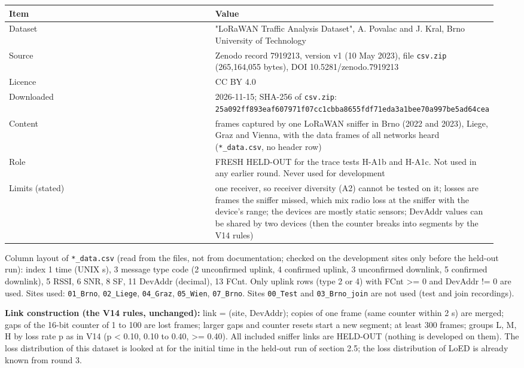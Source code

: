 {\scriptsize\raggedright
\begin{longtable}{p{0.475\linewidth}p{0.475\linewidth}}
\toprule
Item & Value \\
\midrule
\endhead
Dataset & "LoRaWAN Traffic Analysis Dataset", A. Povalac and J. Kral, Brno University of Technology \\
Source & Zenodo record 7919213, version v1 (10 May 2023), file \texttt{csv.zip} (265,164,055 bytes), DOI 10.5281/zenodo.7919213 \\
Licence & CC BY 4.0 \\
Downloaded & 2026-11-15; SHA-256 of \texttt{csv.zip}: \texttt{25a092ff893eaf607971f07cc1cbba8655fdf71eda3a1bee70a997be5ad64cea} \\
Content & frames captured by one LoRaWAN sniffer in Brno (2022 and 2023), Liege, Graz and Vienna, with the data frames of all networks heard (\texttt{*\_data.csv}, no header row) \\
Role & FRESH HELD-OUT for the trace tests H-A1b and H-A1c. Not used in any earlier round. Never used for development \\
Limits (stated) & one receiver, so receiver diversity (A2) cannot be tested on it; losses are frames the sniffer missed, which mix radio loss at the sniffer with the device's range; the devices are mostly static sensors; DevAddr values can be shared by two devices (then the counter breaks into segments by the V14 rules) \\
\bottomrule
\end{longtable}}

Column layout of \texttt{*\_data.csv} (read from the files, not from documentation; checked on the development sites only before the held-out run): index 1 time (UNIX s), 3 message type code (2 unconfirmed uplink, 4 confirmed uplink, 3 unconfirmed downlink, 5 confirmed downlink), 5 RSSI, 6 SNR, 8 SF, 11 DevAddr (decimal), 13 FCnt. Only uplink rows (type 2 or 4) with FCnt >= 0 and DevAddr != 0 are used. Sites used: \texttt{01\_Brno}, \texttt{02\_Liege}, \texttt{04\_Graz}, \texttt{05\_Wien}, \texttt{07\_Brno}. Sites \texttt{00\_Test} and \texttt{03\_Brno\_join} are not used (test and join recordings).

\textbf{Link construction (the V14 rules, unchanged):} link = (site, DevAddr); copies of one frame (same counter within 2 s) are merged; gaps of the 16-bit counter of 1 to 100 are lost frames; larger gaps and counter resets start a new segment; at least 300 frames; groups L, M, H by loss rate p as in V14 (p < 0.10, 0.10 to 0.40, >= 0.40). All included sniffer links are HELD-OUT (nothing is developed on them). The loss distribution of this dataset is looked at for the initial time in the held-out run of section 2.5; the loss distribution of LoED is already known from round 3.

